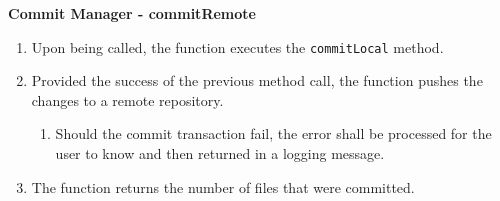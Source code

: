\textbf{Commit Manager - commitRemote}
\begin{enumerate}
    \item Upon being called, the function executes the \texttt{commitLocal} method.
    \item Provided the success of the previous method call, the function pushes the changes to a remote repository.
    \begin{enumerate}
        \item Should the commit transaction fail, the error shall be processed for the user to know and then returned in a logging message.
    \end{enumerate}
    \item The function returns the number of files that were committed.
\end{enumerate}

